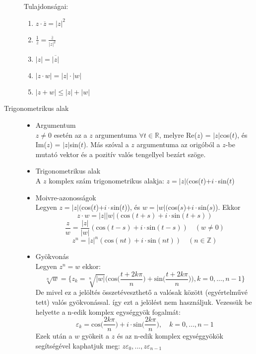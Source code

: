 \documentclass[margin=0px]{article}
\newcommand{\Z}{\mathbb{Z}}
\newcommand{\R}{\mathbb{R}}
\begin{document}
\begin{description}
        Tulajdonságai:
        \begin{enumerate}
            \item $z\cdot\overline{z} = {|z|}^2$
            \item $\frac{1}{z}= \frac{\overline{z}}{|z|^2} $
            \item $|z| = \overline{|z|}$
            \item $|z\cdot w | = |z|\cdot|w|$
            \item $|z+w| \leq |z| +|w|$
        \end{enumerate}
    \item[Trigonometrikus alak] \hfill
        \begin{itemize}
            \item Argumentum \\
                  $z \neq 0$ esetén az a $z$ argumentuma $\forall t \in\R$, melyre Re($z$) = $|z|$cos($t$), és Im($z$) = $|z|$sin($t$). Más szóval a $z$ argumentuma az origóból a $z$-be mutató vektor és a pozitív valós tengellyel bezárt szöge.
            \item Trigonometrikus alak \\
                  A $z$ komplex szám trigonometrikus alakja: $ z = |z|($cos($t$)+$i\cdot$sin($t$)
            \item Moivre-azonosságok \\
                  Legyen $z = |z|($cos($t$)+$i\cdot$sin($t$)), és $w = |w|($cos($s$)+$i\cdot$sin($s$)). Ekkor
                  \[z\cdot w = |z||w|(\textrm{cos}(t+s)+i\cdot \textrm{sin}(t+s))\]
                  \[\frac{z}{w} = \frac{|z|}{|w|}(\textrm{cos}(t-s)+i\cdot \textrm{sin}(t-s)) \quad (w \neq 0)\]
                  \[ z^n = |z|^n(\textrm{cos}(nt)+i\cdot \textrm{sin}(nt)) \quad (n \in \Z)\]
            \item Gyökvonás \\
                  Legyen $z^n = w$ ekkor:
                  \[ \sqrt[n]{w} = \Bigg\{z_k = \sqrt[n]{|w|}\bigg(\textrm{cos}\Big(\frac{t+2k\pi}{n}\Big)+\textrm{sin}\Big(\frac{t+2k\pi}{n}\Big)\bigg), k=0,...,n-1\Bigg\} \]
                  De mivel ez a jelöltés összetéveszthető a valósak között (egyértelművé tett) valós gyökvonással. így ezt a jelölést nem használjuk. Vezessük be helyette a n-edik komplex egységgyök fogalmát:
                  \[\varepsilon_k = \textrm{cos}\bigg(\frac{2k\pi}{n}\bigg)+i\cdot\textrm{sin}\bigg(\frac{2k\pi}{n}\bigg), \quad k=0,...,n-1\]
                  Ezek után a $w$ gyökeit a $z$ és az n-edik komplex egységgyökök segítségével kaphatjuk meg: $z\varepsilon_0, ..., z\varepsilon_{n-1}$
        \end{itemize}

\end{description}
\end{document}
